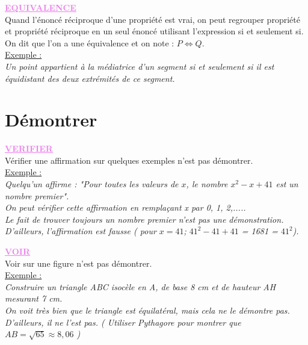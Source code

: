 \documentclass[a4paper,11pt]{article}
\begin{document}
\textbf{\textcolor{violet}{\underline{EQUIVALENCE}}}\\
Quand l'énoncé réciproque d'une propriété est vrai, on peut regrouper propriété et propriété réciproque en un seul énoncé utilisant l'expression si et seulement si.\\
 On dit que l'on a une équivalence et on note : $P \Leftrightarrow Q$.\\
 
 \underline{Exemple :}\\
\textit{Un point appartient à la médiatrice d’un segment si et seulement si il est équidistant des deux extrémités de ce segment.}\\
 
\section{Démontrer}

\textbf{\textcolor{violet}{\underline{VERIFIER}}}\\
Vérifier une affirmation sur quelques exemples n’est pas démontrer.\\

\underline{Exemple :}\\
\textit{Quelqu'un affirme : "Pour toutes les valeurs de $x$, le nombre $x^{2}-x + 41$ est un nombre premier".}\\
\textit{On peut vérifier cette affirmation en remplaçant x par 0, 1, 2,.....}\\
\textit{Le fait de trouver toujours un nombre premier n'est pas une démonstration.}\\
\textit{D'ailleurs, l'affirmation est fausse ( pour $x = 41$; $41^{2}-41+41$ = 1681 = $41^{2}$).}\\
\newpage

\textbf{\textcolor{violet}{\underline{VOIR}}}\\
Voir sur une figure n'est pas démontrer.\\

\underline{Exemple :}\\
\textit{Construire un triangle ABC isocèle en A, de base 8 cm et de hauteur AH mesurant 7 cm. \\
On voit très bien que le triangle est équilatéral, mais cela ne le démontre pas. D'ailleurs, il ne l'est pas. ( Utiliser Pythagore
pour montrer que $AB = \sqrt{65}\approx 8,06$ )}\\

\vspace*{0.5cm}
\end{document}
